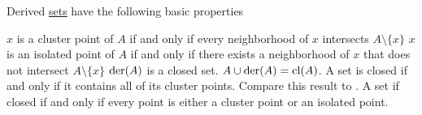 \begin{proposition}\label{thm:derived_set_properties}
  Derived \hyperref[def:topological_derived_set]{sets} have the following basic properties
  \begin{propenum}
     \( x \) is a cluster point of \( A \) if and only if every neighborhood of \( x \) intersects \( A \setminus \{ x \} \)
     \( x \) is an isolated point of \( A \) if and only if there exists a neighborhood of \( x \) that does not intersect \( A \setminus \{ x \} \)
     \( \operatorname{der}(A) \) is a closed set.
     \( A \cup \operatorname{der}(A) = \operatorname{cl}(A) \).
     A set is closed if and only if it contains all of its cluster points. Compare this result to .
     A set if closed if and only if every point is either a cluster point or an isolated point.
  \end{propenum}
\end{proposition}
